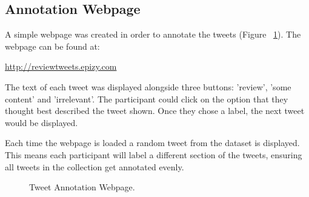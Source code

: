 \subsection{Annotation Webpage}

A simple webpage was created in order to annotate the tweets (Figure ~\ref{fig:webpage}). The webpage can be found at:
\begin{center}
    \url{http://reviewtweets.epizy.com}\newline
\end{center}
The text of each tweet was displayed alongside three buttons: 'review', 'some content' and 'irrelevant'. The participant could click on the option that they thought best described the tweet shown. Once they chose a label, the next tweet would be displayed. 

Each time the webpage is loaded a random tweet from the dataset is displayed. This means each participant will label a different section of the tweets, ensuring all tweets in the collection get annotated evenly.

\begin{figure}[h!]
\centering
{}
\caption{\label{fig:webpage} Tweet Annotation Webpage.}
\end{figure}


